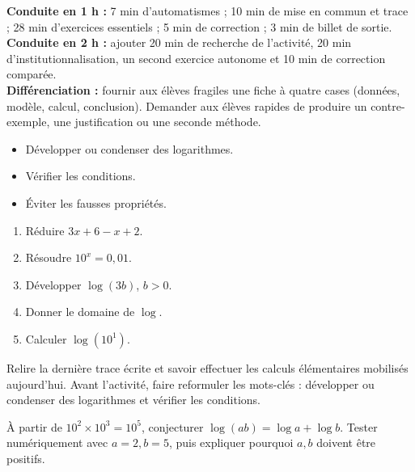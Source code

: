 \ifprof
\begin{methode}
\textbf{Conduite en 1 h :} 7 min d'automatismes ; 10 min de mise en commun et trace ; 28 min d'exercices essentiels ; 5 min de correction ; 3 min de billet de sortie.\\
\textbf{Conduite en 2 h :} ajouter 20 min de recherche de l'activité, 20 min d'institutionnalisation, un second exercice autonome et 10 min de correction comparée.\\
\textbf{Différenciation :} fournir aux élèves fragiles une fiche à quatre cases (données, modèle, calcul, conclusion). Demander aux élèves rapides de produire un contre-exemple, une justification ou une seconde méthode.
\end{methode}
\fi
{}
\begin{objectifs}\begin{itemize}\item Développer ou condenser des logarithmes.\item Vérifier les conditions.\item Éviter les fausses propriétés.\end{itemize}\end{objectifs}
\begin{automatismes}\begin{enumerate}\item Réduire $3x+6-x+2$. \item Résoudre $10^x=0{,}01$. \item Développer $\log(3b)$, $b>0$. \item Donner le domaine de $\log$. \rep{$]0,+\infty[$}\item Calculer $\log(10^1)$. \end{enumerate}\end{automatismes}
\begin{prerequis}Relire la dernière trace écrite et savoir effectuer les calculs élémentaires mobilisés aujourd'hui. Avant l'activité, faire reformuler les mots-clés : développer ou condenser des logarithmes et vérifier les conditions.\end{prerequis}

\begin{activite}
À partir de $10^2\times10^3=10^5$, conjecturer $\log(ab)=\log a+\log b$. Tester numériquement avec $a=2,b=5$, puis expliquer pourquoi $a,b$ doivent être positifs.

\end{activite}

